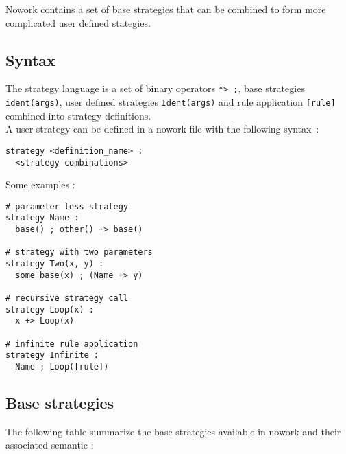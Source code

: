 \documentclass[12pt,a4paper]{article}
\begin{document}
Nowork contains a set of base strategies that can be combined to form more
complicated user defined stategies.

\subsection{Syntax}
The strategy language is a set of binary operators \verb|*> ;|, base strategies 
\verb|ident(args)|, user defined strategies \verb|Ident(args)| and rule 
application \verb|[rule]| combined into strategy definitions.\\

A user strategy can be defined in a nowork file with the following syntax~:
\begin{verbatim}
strategy <definition_name> : 
  <strategy combinations>
\end{verbatim}

Some examples : 

\begin{verbatim}
# parameter less strategy
strategy Name : 
  base() ; other() +> base()

# strategy with two parameters
strategy Two(x, y) :
  some_base(x) ; (Name +> y)

# recursive strategy call
strategy Loop(x) :
  x +> Loop(x)

# infinite rule application
strategy Infinite :
  Name ; Loop([rule])
\end{verbatim}

\subsection{Base strategies}
The following table summarize the base strategies available in nowork and their
associated semantic :\\
\end{document}
